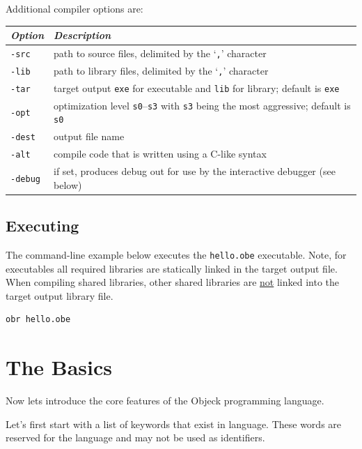 \documentclass[11pt]{article}
\begin{document}
Additional compiler options are:
\begin{center}
  \begin{tabular}{| l | l |}
    \hline
    \emph{Option} & \emph{Description} \\ \hline \hline
    \texttt{-src} & path to source files, delimited by the `\texttt{,}' character \\ \hline
    \texttt{-lib} & path to library files, delimited by the `\texttt{,}'
    character\\ \hline
    \texttt{-tar} & target output \texttt{exe} for executable and \texttt{lib} for library; default is  \texttt{exe} \\ \hline
    \texttt{-opt} & optimization level \texttt{s0}--\texttt{s3} with \texttt{s3} being the most aggressive; default is \texttt{s0} \\ \hline
    \texttt{-dest} & output file name \\ \hline
    \texttt{-alt} & compile code that is written using a C-like syntax \\ \hline
    \texttt{-debug} & if set, produces debug out for use by the interactive debugger (see below) \\ \hline
  \end{tabular}
\end{center}

\subsection{Executing}
The command-line example below executes the \texttt{hello.obe}
executable. Note, for executables all required libraries are
statically linked in the target output file.  When compiling shared
libraries, other shared libraries are \underline{not} linked into the
target output library file.

\begin{verbatim}
obr hello.obe
\end{verbatim}

\section{The Basics}
Now lets introduce the core features of the Objeck programming
language.  \vspace{\baselineskip}

Let's first start with a list of keywords that exist in language.
These words are reserved for the language and may not be used as
identifiers.
\end{document}
